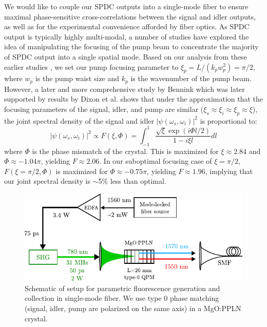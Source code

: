 We would like to couple our SPDC outputs into a single-mode fiber to ensure maximal phase-sensitive cross-correlations between the signal and idler outputs, as well as for the experimental convenience afforded by fiber optics. As SPDC output is typically highly multi-modal, a number of studies \cite{ljunggren-focus,kurtsiefer-spdc,bovino-focus,bennink-focus,fedrizzi-focus,boyd-focus} have explored the idea of manipulating the focusing of the pump beam to concentrate the majority of SPDC output into a single spatial mode. Based on our analysis from these earlier studies \cite{legouet-interferometry}, we set our pump focusing parameter to $\xi_p = L/(k_p w_p^2) = \pi/2$, where $w_p$ is the pump waist size and $k_p$ is the wavenumber of the pump beam. However, a later and more comprehensive study by Bennink \cite{bennink-optimal} which was later supported by results by Dixon et al. \cite{dixon-heralding} shows that under the approximation that the focusing parameters of the signal, idler, and pump are similar ($\xi_s \approx \xi_i \approx \xi_p \approx \xi$), the joint spectral density of the signal and idler $|\psi(\omega_s, \omega_i)|^2$ is proportional to:
\begin{equation}
|\psi(\omega_s, \omega_i)|^2 \propto F(\xi,\Phi) = \int_{-1}^1 \frac{\sqrt{\xi} \exp(i\Phi l/2)}{1-i\xi l} dl
\end{equation}
where $\Phi$ is the phase mismatch of the crystal. This is maximized for $\xi \approx 2.84$ and $\Phi \approx -1.04\pi$, yielding $F \approx 2.06$. In our suboptimal focusing case of $\xi = \pi/2$, $F(\xi = \pi/2, \Phi)$ is maximized for $\Phi \approx -0.75\pi$, yielding $F \approx 1.96$, implying that our joint spectral density is $\sim$5\% less than optimal.

\begin{figure}[t]
\begin{center}
\includegraphics[width=13cm]{figure-pcoct-setup-spdc.pdf}
\caption{Schematic of setup for parametric fluorescence generation and collection in single-mode fiber. We use type 0 phase matching (signal, idler, pump are polarized on the same axis) in a MgO:PPLN crystal.}
\label{figure:pcoct-setup-spdc}
\end{center}
\end{figure}

